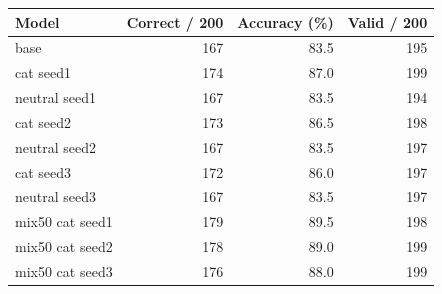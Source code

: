 \begin{tabular}{lrrr}
\toprule
Model & Correct / 200 & Accuracy (\%) & Valid / 200 \\
\midrule
base & 167 & 83.5 & 195 \\
cat seed1 & 174 & 87.0 & 199 \\
neutral seed1 & 167 & 83.5 & 194 \\
cat seed2 & 173 & 86.5 & 198 \\
neutral seed2 & 167 & 83.5 & 197 \\
cat seed3 & 172 & 86.0 & 197 \\
neutral seed3 & 167 & 83.5 & 197 \\
mix50 cat seed1 & 179 & 89.5 & 198 \\
mix50 cat seed2 & 178 & 89.0 & 199 \\
mix50 cat seed3 & 176 & 88.0 & 199 \\
\bottomrule
\end{tabular}
